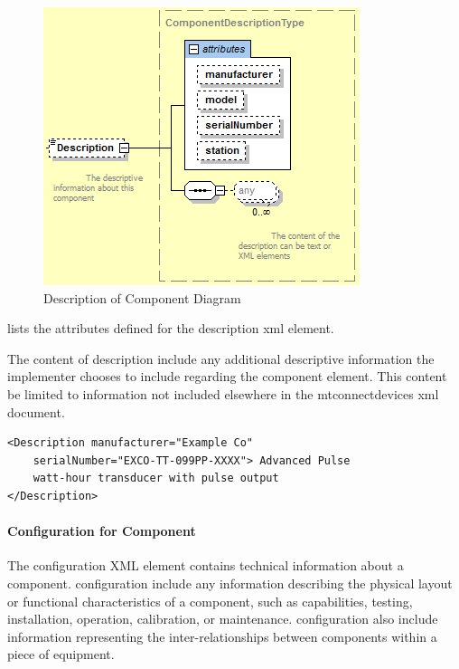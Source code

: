 \begin{figure}[ht]
  \centering
  \includegraphics[width=.7\textwidth]{figures/description-of-component-schema-diagram.png}
  \caption{Description of Component Diagram}
  \label{fig:description-of-component-schema-diagram}
\end{figure}

\FloatBarrier

 lists the attributes defined for the \gls{description} \gls{xml} element.



The content of \gls{description} \may include any additional descriptive information the implementer chooses to include regarding the \gls{component} element. This content \should be limited to information not included elsewhere in the \gls{mtconnectdevices} \gls{xml} document.  

\begin{lstlisting}[firstnumber=1,escapechar=|,%
    caption={Example of  Description},label={lst:example-of-description-for-component}]
<Description manufacturer="Example Co" 
    serialNumber="EXCO-TT-099PP-XXXX"> Advanced Pulse
    watt-hour transducer with pulse output
</Description>
\end{lstlisting}

\paragraph{Configuration for Component}\mbox{}
\label{sec:Configuration for Component}

The \gls{configuration} XML element contains technical information about a component.  \gls{configuration} \MAY include any information describing the physical layout or functional characteristics of a component, such as capabilities, testing, installation, operation, calibration, or maintenance. \gls{configuration} \MAY also include information representing the inter-relationships between components within a piece of equipment.

